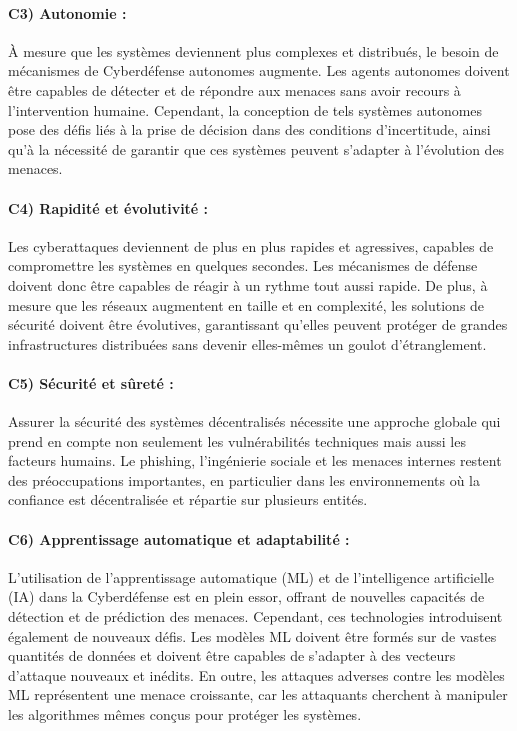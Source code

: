 \paragraph{C3) Autonomie :}
À mesure que les systèmes deviennent plus complexes et distribués, le besoin de mécanismes de Cyberdéfense autonomes augmente. Les agents autonomes doivent être capables de détecter et de répondre aux menaces sans avoir recours à l'intervention humaine. Cependant, la conception de tels systèmes autonomes pose des défis liés à la prise de décision dans des conditions d'incertitude, ainsi qu'à la nécessité de garantir que ces systèmes peuvent s'adapter à l'évolution des menaces.

\paragraph{C4) Rapidité et évolutivité :}
Les cyberattaques deviennent de plus en plus rapides et agressives, capables de compromettre les systèmes en quelques secondes. Les mécanismes de défense doivent donc être capables de réagir à un rythme tout aussi rapide. De plus, à mesure que les réseaux augmentent en taille et en complexité, les solutions de sécurité doivent être évolutives, garantissant qu'elles peuvent protéger de grandes infrastructures distribuées sans devenir elles-mêmes un goulot d'étranglement.

\paragraph{C5) Sécurité et sûreté :}
Assurer la sécurité des systèmes décentralisés nécessite une approche globale qui prend en compte non seulement les vulnérabilités techniques mais aussi les facteurs humains. Le phishing, l'ingénierie sociale et les menaces internes restent des préoccupations importantes, en particulier dans les environnements où la confiance est décentralisée et répartie sur plusieurs entités.

\paragraph{C6) Apprentissage automatique et adaptabilité :}
L’utilisation de l’apprentissage automatique (ML) et de l’intelligence artificielle (IA) dans la Cyberdéfense est en plein essor, offrant de nouvelles capacités de détection et de prédiction des menaces. Cependant, ces technologies introduisent également de nouveaux défis. Les modèles ML doivent être formés sur de vastes quantités de données et doivent être capables de s’adapter à des vecteurs d’attaque nouveaux et inédits. En outre, les attaques adverses contre les modèles ML représentent une menace croissante, car les attaquants cherchent à manipuler les algorithmes mêmes conçus pour protéger les systèmes.

